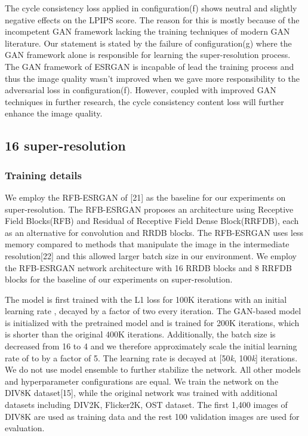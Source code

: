 \documentclass{article}
\begin{document}
The cycle consistency loss applied in configuration(f) shows neutral and slightly negative effects on the LPIPS score. The reason for this is mostly because of the incompetent GAN framework lacking the training techniques of modern GAN literature. Our statement is stated by the failure of configuration(g) where the GAN framework alone is responsible for learning the super-resolution process. The GAN framework of ESRGAN is incapable of lead the training process and thus the image quality wasn't improved when we gave more responsibility to the adversarial loss in configuration(f). However, coupled with improved GAN techniques in further research, the cycle consistency content loss will further enhance the image quality.

\subsection{16 super-resolution}

\subsubsection{Training details}

We employ the RFB-ESRGAN of [21] as the baseline for our experiments on  super-resolution. The RFB-ESRGAN proposes an architecture using Receptive Field Blocks(RFB) and Residual of Receptive Field Dense Block(RRFDB), each as an alternative for convolution and RRDB blocks. The RFB-ESRGAN uses less memory compared to methods that manipulate the image in the intermediate  resolution[22] and this allowed larger batch size in our environment. We employ the RFB-ESRGAN network architecture with 16 RRDB blocks and 8 RRFDB blocks for the baseline of our experiments on  super-resolution.

The model is first trained with the L1 loss for 100K iterations with an initial learning rate , decayed by a factor of two every  iteration. The GAN-based model is initialized with the pretrained model and is trained for 200K iterations, which is shorter than the original 400K iterations. Additionally, the batch size is decreased from 16 to 4 and we therefore approximately scale the initial learning rate of  to  by a factor of 5. The learning rate is decayed at [50\textit{k}, 100\textit{k}] iterations. We do not use model ensemble to further stabilize the network. All other models and hyperparameter configurations are equal. We train the network on the DIV8K dataset[15], while the original network was trained with additional datasets including DIV2K, Flicker2K, OST dataset. The first 1,400 images of DIV8K are used as training data and the rest 100 validation images are used for evaluation. 
\end{document}
